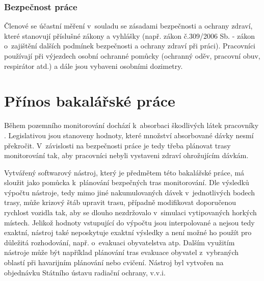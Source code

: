 \subsubsection{Bezpečnost práce}

Členové  se účastní měření v~souladu se zásadami bezpečnosti a ochrany zdraví, které stanovují příslušné zákony a vyhlášky (např. zákon č.309/2006 Sb. - zákon o~zajištění dalších podmínek bezpečnosti a ochrany zdraví při práci). Pracovníci používají při výjezdech osobní ochranné pomůcky (ochranný oděv, pracovní obuv, respirátor atd.) a dále jsou vybaveni osobními dozimetry. 

\section{Přínos bakalářské práce}
Během pozemního monitorování dochází k~absorbaci škodlivých látek pracovníky . Legislativou jsou stanoveny hodnoty, které množství absorbované dávky nesmí překročit. V~závislosti na bezpečnosti práce je tedy třeba plánovat trasy monitorování tak, aby pracovníci  nebyli vystaveni zdraví ohrožujícím dávkám. 

Vytvářený softwarový nástroj, který je předmětem této bakalářské práce, má sloužit jako pomůcka k~plánování bezpečných tras monitorování. Dle výsledků výpočtu nástroje, tedy mimo jiné nakumulovaných dávek v~jednotlivých bodech trasy, může krizový štáb upravit trasu, případně modifikovat doporučenou rychlost vozidla tak, aby se dlouho nezdržovalo v~simulaci vytipovaných horkých místech. Jelikož hodnoty vstupující do výpočtu jsou interpolované a nejsou tedy exaktní, nástroj také neposkytuje exaktní výsledky a není možné ho použít pro důležitá rozhodování, např. o~evakuaci obyvatelstva atp. Dalším využitím nástroje může být například plánování tras evakuace obyvatel z~vybraných oblastí při havarijním plánování nebo cvičení. Nástroj byl vytvořen na objednávku Státního ústavu radiační ochrany, v.v.i.